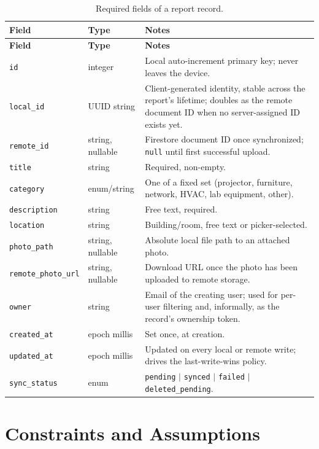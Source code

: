 \begin{longtable}{@{}p{2.6cm}p{2.4cm}p{6.6cm}@{}}
\caption{Required fields of a report record.}
\label{tab:report-fields}\\
\toprule
\textbf{Field} & \textbf{Type} & \textbf{Notes} \\
\midrule
\endfirsthead
\toprule
\textbf{Field} & \textbf{Type} & \textbf{Notes} \\
\midrule
\endhead
\texttt{id} & integer & Local auto-increment primary key; never leaves the
device. \\
\texttt{local\_id} & UUID string & Client-generated identity, stable across
the report's lifetime; doubles as the remote document ID when no
server-assigned ID exists yet. \\
\texttt{remote\_id} & string, nullable & Firestore document ID once
synchronized; \texttt{null} until first successful upload. \\
\texttt{title} & string & Required, non-empty. \\
\texttt{category} & enum/string & One of a fixed set (projector, furniture,
network, HVAC, lab equipment, other). \\
\texttt{description} & string & Free text, required. \\
\texttt{location} & string & Building/room, free text or picker-selected. \\
\texttt{photo\_path} & string, nullable & Absolute local file path to an
attached photo. \\
\texttt{remote\_photo\_url} & string, nullable & Download URL once the
photo has been uploaded to remote storage. \\
\texttt{owner} & string & Email of the creating user; used for
per-user filtering and, informally, as the record's ownership token. \\
\texttt{created\_at} & epoch millis & Set once, at creation. \\
\texttt{updated\_at} & epoch millis & Updated on every local or remote
write; drives the last-write-wins policy. \\
\texttt{sync\_status} & enum & \texttt{pending} $\mid$ \texttt{synced}
$\mid$ \texttt{failed} $\mid$ \texttt{deleted\_pending}. \\
\bottomrule
\end{longtable}

\section{Constraints and Assumptions}
\label{sec:constraints}

